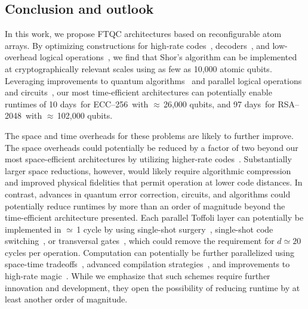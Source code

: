 \documentclass[reprint,twocolumn,secnumarabic,amssymb, aps, prx]{revtex4-2}
\newcommand{\trsatime}{97 days}
\newcommand{\tecctime}{10 days}
\newcommand{\ecc}{\mbox{ECC--256}}
\newcommand{\rsa}{\mbox{RSA--2048}}
\begin{document}
\subsection*{Conclusion and outlook}

In this work, we propose FTQC architectures based on reconfigurable atom arrays. By optimizing constructions for high-rate codes~\cite{Breuckmann2021, panteleev2021quantum, panteleev2022asymptotically, leverrier2022quantum, dinur2022good, bravyi2024high, xu2024constant}, decoders~\cite{hillmann2024localized}, and low-overhead logical operations~\cite{cohen2022low, cross2024improved, gidney2024magic, xu2025fast, zheng2025high}, we find that Shor's algorithm can be implemented at cryptographically relevant scales using as few as 10,000 atomic qubits. Leveraging improvements to quantum algorithms~\cite{babbush2026quantum} and parallel logical operations and circuits~\cite{zhang2025time, draper2004logarithmic}, our most time-efficient architectures can potentially enable runtimes of  \tecctime\ for \ecc\ with $\approx$\,26,000 qubits, and \trsatime\ for \rsa\ with $\approx$\,102,000 qubits. 

The space and time overheads for these problems are likely to further improve. The space overheads could potentially be reduced by a factor of two beyond our most space-efficient architectures by utilizing higher-rate codes~\cite{caltech2026codeatlas}. Substantially larger space reductions, however, would likely require algorithmic compression and improved physical fidelities that permit operation at lower code distances. In contrast, advances in quantum error correction, circuits, and algorithms could potentially reduce runtimes by more than an order of magnitude beyond the time-efficient architecture presented. Each parallel Toffoli layer can potentially be implemented in $\simeq$\,1 cycle by using single-shot surgery~\cite{baspin2025fast, cowtan2025fast, xu2025batched, chang2026constant}, single-shot code switching~\cite{tan2025single, li2025transversal, golowich2025constant}, or transversal gates~\cite{cain2024correlated, zhou2024algorithmic, bombin2013gauge, brown2016fault, menon2025magic, jacob2026single, xu2025fast}, which could remove the requirement for \mbox{$d\simeq 20$} cycles per operation. Computation can potentially be further parallelized using space-time tradeoffs~\cite{fowler2012bridge, fowler2012time, xu2024fast}, advanced compilation strategies~\cite{litinski2022active, webster2026pinnacle}, and improvements to high-rate magic~\cite{menon2025magic, li2025transversal}. While we emphasize that such schemes require further innovation and development, they open the possibility of reducing runtime by at least another order of magnitude. 
\end{document}
